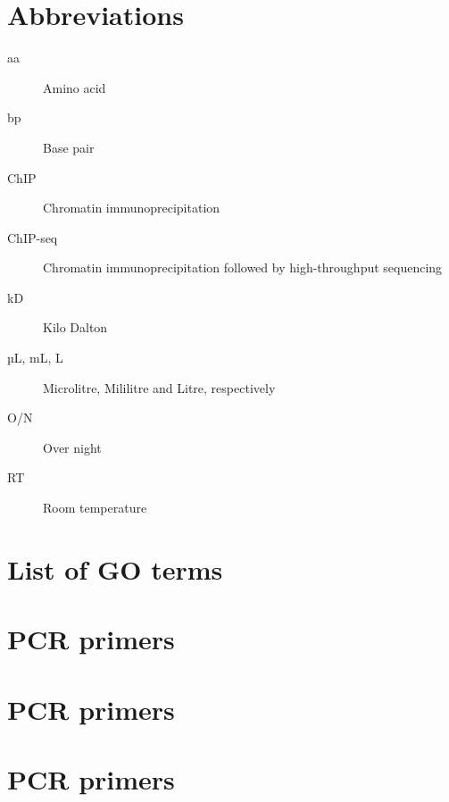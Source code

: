 \documentclass[11pt,twoside,a4paper]{report}
\begin{document}
\cleardoublepage
\begin{appendices}
	\chapter{Abbreviations}
		\begin{description}
			\item[aa] Amino acid
			\item[bp] Base pair
			\item[ChIP] Chromatin immunoprecipitation
			\item[ChIP-seq] Chromatin immunoprecipitation followed by high-throughput sequencing
			\item[kD] Kilo Dalton
			\item[µL, mL, L] Microlitre, Mililitre and Litre, respectively
			\item[O/N] Over night
			\item[RT] Room temperature
		\end{description}

	\chapter{List of GO terms}
	\chapter{PCR primers}
	\chapter{PCR primers}
	\chapter{PCR primers}
\end{appendices}
\end{document}
